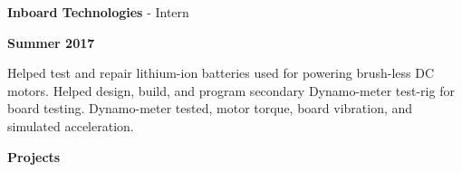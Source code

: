 \documentclass[paper=a4,fontsize=11pt]{article} %
\def \sectionSpace      {0.7cm}     %
\def \subSectionSpace   {0.3cm}     %
\def \leftColSpace      {0.12}      %
\def \middleColSpace    {0.675}     %
\def \bigMiddleColSpace {0.875}     %
\def \rightColSpace     {0.25}      %
\begin{document}
\noindent
\begin{minipage}[t]{\leftColSpace\linewidth}
    \hfill
\end{minipage}
\begin{minipage}[t]{\middleColSpace\linewidth}
    \vspace{\subSectionSpace}
    \noindent \textbf{Inboard Technologies} - Intern
\end{minipage}
\begin{minipage}[t]{\rightColSpace\linewidth}
    \begin{flushleft}
        \vspace{\subSectionSpace}
        \noindent \textbf{Summer 2017}
    \end{flushleft}
\end{minipage}

\noindent
\begin{minipage}[t]{\leftColSpace\linewidth}
    \hfill
\end{minipage}
\begin{minipage}[t]{\bigMiddleColSpace\linewidth}
    Helped test and repair lithium-ion batteries used for powering brush-less DC motors. Helped design, build, and program secondary Dynamo-meter test-rig for board testing. Dynamo-meter tested, motor torque, board vibration, and simulated acceleration.
\end{minipage}

\vspace{\sectionSpace}
\noindent
\begin{minipage}[t]{\leftColSpace\linewidth}
    \noindent \textbf{Projects}\\
\end{minipage}
\begin{minipage}[t]{\middleColSpace\linewidth}
\end{minipage}
\end{document}

